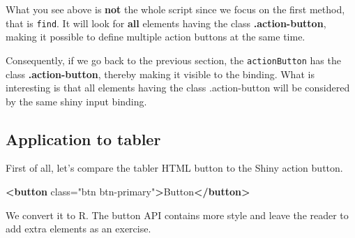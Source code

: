 \documentclass[]{book}
\newenvironment{Shaded}{\begin{snugshade}}{\end{snugshade}}
\newcommand{\KeywordTok}[1]{\textcolor[rgb]{0.13,0.29,0.53}{\textbf{#1}}}
\newcommand{\NormalTok}[1]{#1}
\newcommand{\OtherTok}[1]{\textcolor[rgb]{0.56,0.35,0.01}{#1}}
\newcommand{\StringTok}[1]{\textcolor[rgb]{0.31,0.60,0.02}{#1}}
\begin{document}
What you see above is \textbf{not} the whole script since we focus on the first method, that is \texttt{find}. It will look for \textbf{all} elements having the class \textbf{.action-button}, making it possible to define multiple action buttons at the same time.

Consequently, if we go back to the previous section, the \texttt{actionButton} has the class \textbf{.action-button}, thereby making it visible to the binding. What is interesting is that all elements having the class .action-button will be considered by the same shiny input binding.

\hypertarget{application-to-tabler}{%
\subsection{Application to tabler}\label{application-to-tabler}}

First of all, let's compare the tabler HTML button to the Shiny action button.

\begin{Shaded}
\begin{Highlighting}[]
\KeywordTok{<button}\OtherTok{ class=}\StringTok{"btn btn-primary"}\KeywordTok{>}\NormalTok{Button}\KeywordTok{</button>}
\end{Highlighting}
\end{Shaded}

We convert it to R. The button API contains more style and leave the reader to add extra elements as an exercise.
\end{document}

